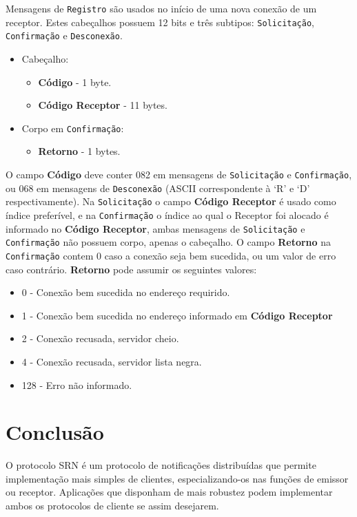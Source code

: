 \documentclass[12pt]{article}
\begin{document}
Mensagens de {\tt Registro} são usados no início de uma nova conexão de um receptor.
Estes cabeçalhos possuem 12 bits e três subtipos:
{\tt Solicitação}, {\tt Confirmação} e {\tt Desconexão}.
\begin{itemize}
\item Cabeçalho:
	\begin{itemize}
	\item {\bf Código} - 1 byte.
	\item {\bf Código Receptor} - 11 bytes.
	\end{itemize}
\item Corpo em {\tt Confirmação}:
	\begin{itemize}
	\item {\bf Retorno} - 1 bytes.
	\end{itemize}
\end{itemize}
O campo {\bf Código} deve conter 082 em mensagens de {\tt Solicitação} e {\tt Confirmação},
ou 068 em mensagens de {\tt Desconexão} (ASCII correspondente à `R' e `D' respectivamente).
Na {\tt Solicitação} o campo {\bf Código Receptor} é usado como índice preferível,
e na {\tt Confirmação} o índice ao qual o Receptor foi alocado é informado no {\bf Código Receptor},
ambas mensagens de {\tt Solicitação} e {\tt Confirmação} não possuem corpo, apenas o cabeçalho.
O campo {\bf Retorno} na {\tt Confirmação} contem 0 caso a conexão seja bem sucedida, ou um valor de erro caso contrário.
{\bf Retorno} pode assumir os seguintes valores:
\begin{itemize}
\item 0 - Conexão bem sucedida no endereço requirido.
\item 1 - Conexão bem sucedida no endereço informado em {\bf Código Receptor}
\item 2 - Conexão recusada, servidor cheio.
\item 4 - Conexão recusada, servidor lista negra.
\item 128 - Erro não informado.
\end{itemize}

\section{Conclusão}\label{sec:Conclusao}

O protocolo SRN é um protocolo de notificações distribuídas que permite implementação mais simples de clientes,
especializando-os nas funções de emissor ou receptor.
Aplicações que disponham de mais robustez podem implementar ambos os protocolos de cliente se assim desejarem.
\end{document}
